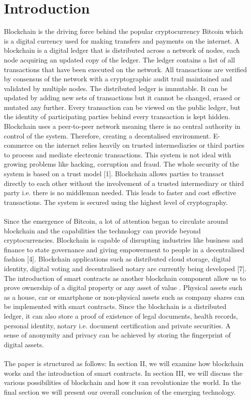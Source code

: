 \documentclass[report]{IEEEtran}
\begin{document}
\section{Introduction}
Blockchain is the driving force behind the popular cryptocurrency Bitcoin which is a digital currency used for making transfers and payments on the internet. A blockchain is a digital ledger that is distributed across a network of nodes, each node acquiring an updated copy of the ledger. The ledger contains a list of all transactions that have been executed on the network. All transactions are verified by consensus of the network with a cryptographic audit trail maintained and validated by multiple nodes. The distributed ledger is immutable. It can be updated by adding new sets of transactions but it cannot be changed, erased or mutated any further. Every transaction can be viewed on the public ledger, but the identity of participating parties behind every transaction is kept hidden. Blockchain uses a peer-to-peer network \cite{bitcoin} meaning there is no central authority in control of the system. Therefore, creating a decentalised environment. E-commerce on the internet relies heavily on trusted intermediaries or third parties to process and mediate electronic transactions. This system is not ideal with growing problems like hacking, corruption and fraud. The whole security of the system is based on a trust model [1]. Blockchain allows parties to transact directly to each other without the involvement of a trusted intermediary or third party i.e. there is no middleman needed. This leads to faster and cost effective transactions. The system is secured using the highest level of cryptography.
\\\\ Since the emergence of Bitcoin, a lot of attention began to circulate around blockchain and the capabilities the technology can provide beyond cryptocurrencies. Blockchain is capable of disrupting industries like business and finance to state governance and giving empowerment to people in a decentralised fashion [4]. Blockchain applications such as distributed cloud storage, digital identity, digital voting and decentralised notary are currently being developed [7]. The introduction of smart contracts as another blockchain component allow us to prove ownership of a digital property or any asset of value \cite{blockchain&smartcontracts}. Physical assets such as a house, car or smartphone or non-physical assets such as company shares can be implemented with smart contracts. Since the blockchain is a distributed ledger, it can also store a proof of existence of legal documents, health records, personal identity, notary i.e. document certification and private securities. A sense of anonymity and privacy can be achieved by storing the fingerprint of digital assets. 
\\\\ The paper is structured as follows: In section II, we will examine how blockchain works and the introduction of smart contracts. In section III, we will discuss the various possibilities of blockchain and how it can revolutionize the world. In the final section we will present our overall conclusion of the emerging technology.
\end{document}
